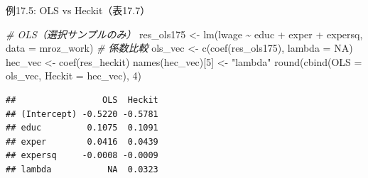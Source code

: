 \documentclass[
  ignorenonframetext,
]{beamer}
\newenvironment{Shaded}{\begin{snugshade}}{\end{snugshade}}
\newcommand{\AttributeTok}[1]{\textcolor[rgb]{0.77,0.63,0.00}{#1}}
\newcommand{\CommentTok}[1]{\textcolor[rgb]{0.56,0.35,0.01}{\textit{#1}}}
\newcommand{\ConstantTok}[1]{\textcolor[rgb]{0.00,0.00,0.00}{#1}}
\newcommand{\DecValTok}[1]{\textcolor[rgb]{0.00,0.00,0.81}{#1}}
\newcommand{\FunctionTok}[1]{\textcolor[rgb]{0.00,0.00,0.00}{#1}}
\newcommand{\NormalTok}[1]{#1}
\newcommand{\OtherTok}[1]{\textcolor[rgb]{0.56,0.35,0.01}{#1}}
\newcommand{\SpecialCharTok}[1]{\textcolor[rgb]{0.00,0.00,0.00}{#1}}
\newcommand{\StringTok}[1]{\textcolor[rgb]{0.31,0.60,0.02}{#1}}
\begin{document}
\begin{frame}[fragile]{例17.5: OLS vs Heckit（表17.7）}
\protect\hypertarget{ux4f8b17.5-ols-vs-heckitux886817.7}{}
\footnotesize

\begin{Shaded}
\begin{Highlighting}[]
\CommentTok{\# OLS（選択サンプルのみ）}
\NormalTok{res\_ols175 }\OtherTok{\textless{}{-}} \FunctionTok{lm}\NormalTok{(lwage }\SpecialCharTok{\textasciitilde{}}\NormalTok{ educ }\SpecialCharTok{+}\NormalTok{ exper }\SpecialCharTok{+}\NormalTok{ expersq, }\AttributeTok{data =}\NormalTok{ mroz\_work)}
\CommentTok{\# 係数比較}
\NormalTok{ols\_vec }\OtherTok{\textless{}{-}} \FunctionTok{c}\NormalTok{(}\FunctionTok{coef}\NormalTok{(res\_ols175), }\AttributeTok{lambda =} \ConstantTok{NA}\NormalTok{)}
\NormalTok{hec\_vec }\OtherTok{\textless{}{-}} \FunctionTok{coef}\NormalTok{(res\_heckit)}
\FunctionTok{names}\NormalTok{(hec\_vec)[}\DecValTok{5}\NormalTok{] }\OtherTok{\textless{}{-}} \StringTok{"lambda"}
\FunctionTok{round}\NormalTok{(}\FunctionTok{cbind}\NormalTok{(}\AttributeTok{OLS =}\NormalTok{ ols\_vec, }\AttributeTok{Heckit =}\NormalTok{ hec\_vec), }\DecValTok{4}\NormalTok{)}
\end{Highlighting}
\end{Shaded}

\begin{verbatim}
##                 OLS  Heckit
## (Intercept) -0.5220 -0.5781
## educ         0.1075  0.1091
## exper        0.0416  0.0439
## expersq     -0.0008 -0.0009
## lambda           NA  0.0323
\end{verbatim}

\normalsize
\end{frame}
\end{document}
